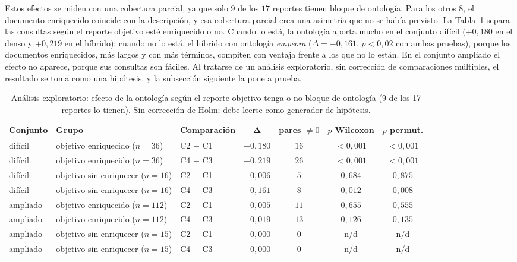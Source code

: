\documentclass[11pt,letterpaper]{article}
\numberwithin{equation}{section}
\begin{document}
Estos efectos se miden con una cobertura parcial, ya que solo $9$ de los $17$ reportes tienen bloque de ontología. Para los otros $8$, el documento enriquecido coincide con la descripción, y esa cobertura parcial crea una asimetría que no se había previsto. La Tabla~\ref{tab:cobertura} separa las consultas según el reporte objetivo esté enriquecido o no. Cuando lo está, la ontología aporta mucho en el conjunto difícil ($+0{,}180$ en el denso y $+0{,}219$ en el híbrido); cuando no lo está, el híbrido con ontología \emph{empeora} ($\Delta=-0{,}161$, $p<0{,}02$ con ambas pruebas), porque los documentos enriquecidos, más largos y con más términos, compiten con ventaja frente a los que no lo están. En el conjunto ampliado el efecto no aparece, porque sus consultas son fáciles. Al tratarse de un análisis exploratorio, sin corrección de comparaciones múltiples, el resultado se toma como una hipótesis, y la subsección siguiente la pone a prueba.

\begin{table}[htbp]
\centering
\footnotesize
\setlength{\tabcolsep}{5pt}
\renewcommand{\arraystretch}{1.25}
\caption{Análisis exploratorio: efecto de la ontología según el reporte objetivo tenga o no bloque de ontología (9 de los 17 reportes lo tienen). Sin corrección de Holm; debe leerse como generador de hipótesis.}
\label{tab:cobertura}
\begin{tabularx}{\textwidth}{@{}l l l c c c c@{}}
\toprule
\textbf{Conjunto} & \textbf{Grupo} & \textbf{Comparación} & $\boldsymbol{\Delta}$ & \textbf{pares $\neq 0$} & \textbf{$p$ Wilcoxon} & \textbf{$p$ permut.} \\
\midrule
difícil & objetivo enriquecido ($n{=}36$) & C2 $-$ C1 & $+0{,}180$ & $16$ & $<\!0{,}001$ & $<\!0{,}001$ \\
difícil & objetivo enriquecido ($n{=}36$) & C4 $-$ C3 & $+0{,}219$ & $26$ & $<\!0{,}001$ & $<\!0{,}001$ \\
difícil & objetivo sin enriquecer ($n{=}16$) & C2 $-$ C1 & $-0{,}006$ & $5$ & $0{,}684$ & $0{,}875$ \\
difícil & objetivo sin enriquecer ($n{=}16$) & C4 $-$ C3 & $-0{,}161$ & $8$ & $0{,}012$ & $0{,}008$ \\
ampliado & objetivo enriquecido ($n{=}112$) & C2 $-$ C1 & $-0{,}005$ & $11$ & $0{,}655$ & $0{,}555$ \\
ampliado & objetivo enriquecido ($n{=}112$) & C4 $-$ C3 & $+0{,}019$ & $13$ & $0{,}126$ & $0{,}135$ \\
ampliado & objetivo sin enriquecer ($n{=}15$) & C2 $-$ C1 & $+0{,}000$ & $0$ & n/d & n/d \\
ampliado & objetivo sin enriquecer ($n{=}15$) & C4 $-$ C3 & $+0{,}000$ & $0$ & n/d & n/d \\
\bottomrule
\end{tabularx}
\end{table}
\end{document}
